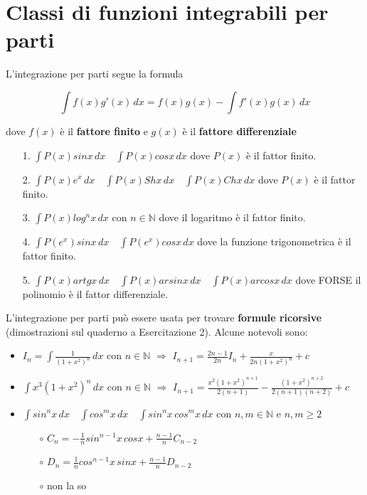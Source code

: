 \documentclass{article}
\theoremstyle{definition}
\theoremstyle{definition}
\theoremstyle{definition}
\theoremstyle{definition}
\theoremstyle{definition}
\begin{document}
\newpage
\section{Classi di funzioni integrabili per parti}

L'integrazione per parti segue la formula 

\[
    \int f(x)g'(x)\, dx=f(x)g(x)- \int f'(x)g(x)\, dx
\]

dove $f(x)$ è il \textbf{fattore finito} e $g(x)$ è il \textbf{fattore differenziale}
\begin{itemize}
    \item [1.] $\displaystyle{\int P(x)sinx\,dx}\quad \displaystyle{\int P(x)cosx\,dx}$ dove $P(x)$ è il fattor finito.
    \item [2.] $\displaystyle{\int P(x)e^x\, dx} \quad \displaystyle{\int P(x)Shx\, dx} \quad \displaystyle{\int P(x)Chx\, dx}$ dove $P(x)$ è il fattor finito.
    \item [3.] $\displaystyle{\int P(x)log^nx\, dx}$ con $n\in\mathbb{N}$ dove il logaritmo è il fattor finito.
    \item [4.] $\displaystyle{\int P(e^x)sinx\,dx} \quad \displaystyle{\int P(e^x)cosx\,dx}$ dove la funzione trigonometrica è il fattor finito.
    \item [5.] $\displaystyle{\int P(x)artgx\, dx} \quad \displaystyle{\int P(x)arsinx\, dx} \quad \displaystyle{\int P(x)arcosx\, dx}$ dove FORSE il polinomio è il fattor differenziale.
\end{itemize}

L'integrazione per parti può essere usata per trovare \textbf{formule ricorsive} (dimostrazioni sul quaderno a Esercitazione 2). Alcune notevoli sono:
\begin{itemize}
    \item $\displaystyle{I_n=\int \frac{1}{(1+x^2)^n}\,dx}$ con $n\in\mathbb{N}$ $\Longrightarrow$ $\displaystyle{I_{n+1}= \frac{2n-1}{2n}I_n+\frac{x}{2n(1+x^2)^n}}+c$
    \item $\displaystyle{\int x^3 (1+x^2)^n\, dx}$ con $n\in\mathbb{N}$ $\Longrightarrow$ $\displaystyle{I_{n+1}=\frac{x^2(1+x^2)^{n+1}}{2(n+1)} - \frac{(1+x^2)^{n+2}}{2(n+1)(n+2)}}+c$
    \item $\displaystyle{\int sin^nx\,dx} \quad \displaystyle{\int cos^mx\,dx} \quad \displaystyle{\int sin^nx\,cos^mx\,dx}$ con $n,m\in\mathbb{N}$ e $n,m \geq 2$
    \begin{itemize}
        \item [$\circ$] $\displaystyle{C_n=-\frac{1}{n}sin^{n-1}x\,cosx+\frac{n-1}{n}C_{n-2}}$ 
        \item [$\circ$] $\displaystyle{D_n=\frac{1}{n}cos^{n-1}x\,sinx+\frac{n-1}{n}D_{n-2}}$
        \item [$\circ$] non la so
    \end{itemize}
\end{itemize}
\end{document}
